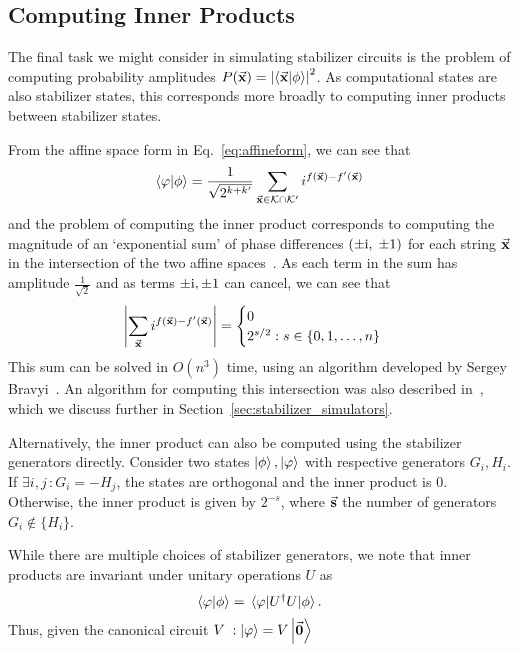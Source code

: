 \subsection{Computing Inner Products}\label{sec:innerproduct}
The final task we might consider in simulating stabilizer circuits is the problem of computing probability amplitudes $P(\va{x})=\left\vert \braket{\va{x}}{\phi}\right\vert^{2}$. As computational states are also stabilizer states, this corresponds more broadly to computing inner products between stabilizer states.\par
From the affine space form in Eq.~\ref{eq:affineform}, we can see that
\begin{equation}
\braket{\varphi}{\phi} = \frac{1}{\sqrt{2^{k+k'}}}\sum_{\va{x}\in\mathcal{K}\cap\mathcal{K'}} i^{f(\va{x})-f'(\va{x})}\label{eq:affine_ip}
\end{equation}
and the problem of computing the inner product corresponds to computing the magnitude of an `exponential sum' of phase differences $(\pm\mathrm{i},\;\pm 1)$ for each string $\va{x}$ in the intersection of the two affine spaces~\cite{Bravyi2016}. As each term in the sum has amplitude $\frac{1}{\sqrt{2}}$ and as terms $\pm \mathrm{i}, \pm 1$ can cancel, we can see that
\[
\left\vert \sum_{\va{x}} i^{f(\va{x})-f'(\va{x})}\right\vert = \begin{cases}
0 \\
2^{s/2} : s\in \{0,1,\dots,n\}
\end{cases}
\]
This sum can be solved in $O(n^{3})$ time, using an algorithm developed by Sergey Bravyi~\cite{Bravyi2016,Bravyi2018,Bravyi2017}. An algorithm for computing this intersection was also described in~\cite{Bravyi2016}, which we discuss further in Section~\ref{sec:stabilizer_simulators}.\par
Alternatively, the inner product can also be computed using the stabilizer generators directly. Consider two states $\ket{\phi},\ket{\varphi}$ with respective generators $G_{i},H_{i}$. If $\exists i,j\,:G_{i}=-H_{j}$, the states are orthogonal and the inner product is $0$. Otherwise, the inner product is given by $2^{-s}$, where $\va{s}$ the number of generators $G_{i}\notin \{H_{i}\}$.\par
While there are multiple choices of stabilizer generators, we note that inner products are invariant under unitary operations $U$ as
\[
\braket{\varphi}{\phi} = \matrixel{\varphi}{U^{\dagger}U}{\phi}.
\]
Thus, given the canonical circuit $V\; : \ket{\varphi}=V\ket{\va{0}}$
